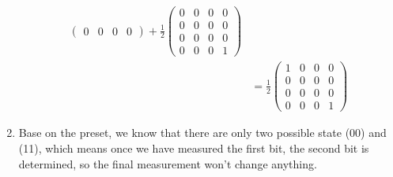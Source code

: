 \documentclass{article}%
\begin{document}
\begin{enumerate}
\begin{align*}
\begin{pmatrix}
                                        0 & 0 & 0 & 0
                                    \end{pmatrix}
              + \frac{1}{2} \begin{pmatrix}
                                0 & 0 & 0 & 0 \\
                                0 & 0 & 0 & 0 \\
                                0 & 0 & 0 & 0 \\
                                0 & 0 & 0 & 1
                            \end{pmatrix}         \\
                    & = \frac{1}{2} \begin{pmatrix}
                                        1 & 0 & 0 & 0 \\
                                        0 & 0 & 0 & 0 \\
                                        0 & 0 & 0 & 0 \\
                                        0 & 0 & 0 & 1
                                    \end{pmatrix}
          \end{align*}

    \item Base on the preset, we know that there are only two possible state (00) and (11),
          which means once we have measured the first bit, the second bit is determined, so the final measurement won't change anything.


\end{enumerate}
\end{document}
